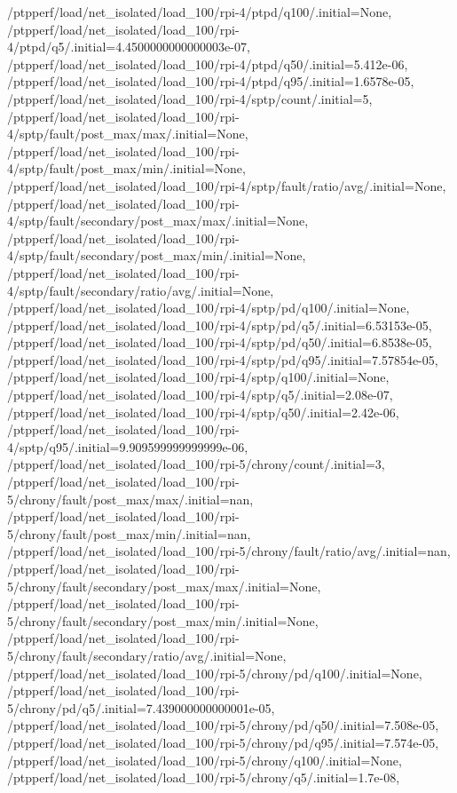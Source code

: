 {    /ptpperf/load/net_isolated/load_100/rpi-4/ptpd/q100/.initial=None,
    /ptpperf/load/net_isolated/load_100/rpi-4/ptpd/q5/.initial=4.4500000000000003e-07,
    /ptpperf/load/net_isolated/load_100/rpi-4/ptpd/q50/.initial=5.412e-06,
    /ptpperf/load/net_isolated/load_100/rpi-4/ptpd/q95/.initial=1.6578e-05,
    /ptpperf/load/net_isolated/load_100/rpi-4/sptp/count/.initial=5,
    /ptpperf/load/net_isolated/load_100/rpi-4/sptp/fault/post_max/max/.initial=None,
    /ptpperf/load/net_isolated/load_100/rpi-4/sptp/fault/post_max/min/.initial=None,
    /ptpperf/load/net_isolated/load_100/rpi-4/sptp/fault/ratio/avg/.initial=None,
    /ptpperf/load/net_isolated/load_100/rpi-4/sptp/fault/secondary/post_max/max/.initial=None,
    /ptpperf/load/net_isolated/load_100/rpi-4/sptp/fault/secondary/post_max/min/.initial=None,
    /ptpperf/load/net_isolated/load_100/rpi-4/sptp/fault/secondary/ratio/avg/.initial=None,
    /ptpperf/load/net_isolated/load_100/rpi-4/sptp/pd/q100/.initial=None,
    /ptpperf/load/net_isolated/load_100/rpi-4/sptp/pd/q5/.initial=6.53153e-05,
    /ptpperf/load/net_isolated/load_100/rpi-4/sptp/pd/q50/.initial=6.8538e-05,
    /ptpperf/load/net_isolated/load_100/rpi-4/sptp/pd/q95/.initial=7.57854e-05,
    /ptpperf/load/net_isolated/load_100/rpi-4/sptp/q100/.initial=None,
    /ptpperf/load/net_isolated/load_100/rpi-4/sptp/q5/.initial=2.08e-07,
    /ptpperf/load/net_isolated/load_100/rpi-4/sptp/q50/.initial=2.42e-06,
    /ptpperf/load/net_isolated/load_100/rpi-4/sptp/q95/.initial=9.909599999999999e-06,
    /ptpperf/load/net_isolated/load_100/rpi-5/chrony/count/.initial=3,
    /ptpperf/load/net_isolated/load_100/rpi-5/chrony/fault/post_max/max/.initial=nan,
    /ptpperf/load/net_isolated/load_100/rpi-5/chrony/fault/post_max/min/.initial=nan,
    /ptpperf/load/net_isolated/load_100/rpi-5/chrony/fault/ratio/avg/.initial=nan,
    /ptpperf/load/net_isolated/load_100/rpi-5/chrony/fault/secondary/post_max/max/.initial=None,
    /ptpperf/load/net_isolated/load_100/rpi-5/chrony/fault/secondary/post_max/min/.initial=None,
    /ptpperf/load/net_isolated/load_100/rpi-5/chrony/fault/secondary/ratio/avg/.initial=None,
    /ptpperf/load/net_isolated/load_100/rpi-5/chrony/pd/q100/.initial=None,
    /ptpperf/load/net_isolated/load_100/rpi-5/chrony/pd/q5/.initial=7.439000000000001e-05,
    /ptpperf/load/net_isolated/load_100/rpi-5/chrony/pd/q50/.initial=7.508e-05,
    /ptpperf/load/net_isolated/load_100/rpi-5/chrony/pd/q95/.initial=7.574e-05,
    /ptpperf/load/net_isolated/load_100/rpi-5/chrony/q100/.initial=None,
    /ptpperf/load/net_isolated/load_100/rpi-5/chrony/q5/.initial=1.7e-08,
}
